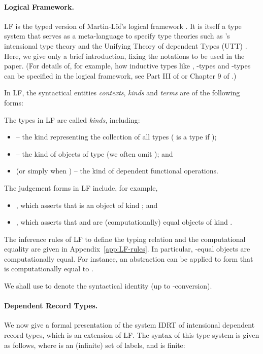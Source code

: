 \documentclass[submission,copyright,creativecommons]{eptcs}
\begin{document}
\paragraph{Logical Framework.}  LF \cite{luo:book94} is the typed version of Martin-L\"{o}f's logical framework \cite{NPS:book}.  It is itself a type system that serves as a meta-language to specify type theories such as \ML's intensional type theory \cite{NPS:book} and the Unifying Theory of dependent Types (UTT) \cite{luo:book94}.  Here, we give only a brief introduction, fixing the notations to be used in the paper.  (For details of, for example, how inductive types like , -types and -types can be specified in the logical framework, see Part III of \cite{NPS:book} or Chapter 9 of \cite{luo:book94}.)

In LF, the syntactical entities \emph{contexts}, \emph{kinds} and \emph{terms} are of the following forms:

The types in LF are called \emph{kinds}, including:
\begin{itemize}
\item  -- the kind representing the collection of all types ( is a type if );
\item  -- the kind of objects of type  (we often omit ); and
\item  (or simply  when ) -- the kind of dependent functional operations.
\end{itemize}
The judgement forms in LF include, for example,
\begin{itemize}
  \item , which asserts that  is an object of kind ; and
  \item , which asserts that  and  are (computationally) equal objects of kind .
\end{itemize}
The inference rules of LF to define the typing relation and the computational equality are given in Appendix~\ref{app:LF-rules}.  In particular, -equal objects are computationally equal.  For instance, an abstraction  can be applied to form  that is computationally equal to .

\begin{notation}
We shall use  to denote the syntactical identity (up to -conversion).
\end{notation}

\paragraph{Dependent Record Types.}
We now give a formal presentation of the system IDRT of intensional dependent record types, which is an extension of LF.  The syntax of this type system is given as follows, where  is an (infinite) set of labels,  and  is finite:
\end{document}

